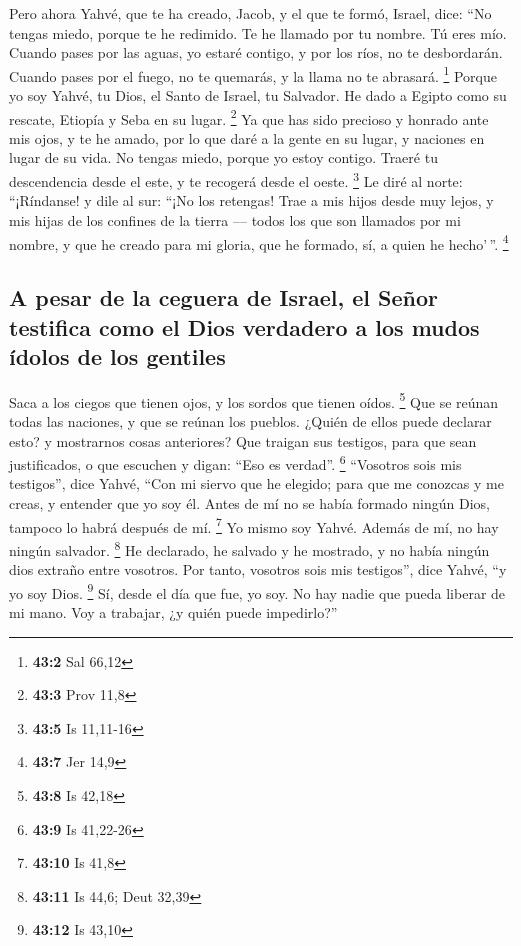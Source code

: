 \begin{paracol}{2}
 Pero ahora Yahvé, que te ha creado, Jacob, y el que te
formó, Israel, dice: ``No tengas miedo, porque te he redimido. Te he
llamado por tu nombre. Tú eres mío.  Cuando pases por las
aguas, yo estaré contigo, y por los ríos, no te desbordarán. Cuando
pases por el fuego, no te quemarás, y la llama no te abrasará.
\footnote{\textbf{43:2} Sal 66,12}  Porque yo soy Yahvé,
tu Dios, el Santo de Israel, tu Salvador. He dado a Egipto como su
rescate, Etiopía y Seba en su lugar. \footnote{\textbf{43:3} Prov 11,8}
 Ya que has sido precioso y honrado ante mis ojos, y te he
amado, por lo que daré a la gente en su lugar, y naciones en lugar de su
vida.  No tengas miedo, porque yo estoy contigo. Traeré tu
descendencia desde el este, y te recogerá desde el oeste. \footnote{\textbf{43:5}
  Is 11,11-16}  Le diré al norte: ``¡Ríndanse! y dile al
sur: ``¡No los retengas! Trae a mis hijos desde muy lejos, y mis hijas
de los confines de la tierra ---  todos los que son
llamados por mi nombre, y que he creado para mi gloria, que he formado,
sí, a quien he hecho'\,''. \footnote{\textbf{43:7} Jer 14,9}

\hypertarget{a-pesar-de-la-ceguera-de-israel-el-seuxf1or-testifica-como-el-dios-verdadero-a-los-mudos-uxeddolos-de-los-gentiles}{%
\subsection{A pesar de la ceguera de Israel, el Señor testifica como el
Dios verdadero a los mudos ídolos de los
gentiles}\label{a-pesar-de-la-ceguera-de-israel-el-seuxf1or-testifica-como-el-dios-verdadero-a-los-mudos-uxeddolos-de-los-gentiles}}

 Saca a los ciegos que tienen ojos, y los sordos que
tienen oídos. \footnote{\textbf{43:8} Is 42,18}  Que se
reúnan todas las naciones, y que se reúnan los pueblos. ¿Quién de ellos
puede declarar esto? y mostrarnos cosas anteriores? Que traigan sus
testigos, para que sean justificados, o que escuchen y digan: ``Eso es
verdad''. \footnote{\textbf{43:9} Is 41,22-26} 
``Vosotros sois mis testigos'', dice Yahvé, ``Con mi siervo que he
elegido; para que me conozcas y me creas, y entender que yo soy él.
Antes de mí no se había formado ningún Dios, tampoco lo habrá después de
mí. \footnote{\textbf{43:10} Is 41,8}  Yo mismo soy
Yahvé. Además de mí, no hay ningún salvador. \footnote{\textbf{43:11} Is
  44,6; Deut 32,39}  He declarado, he salvado y he
mostrado, y no había ningún dios extraño entre vosotros. Por tanto,
vosotros sois mis testigos'', dice Yahvé, ``y yo soy Dios. \footnote{\textbf{43:12}
  Is 43,10}  Sí, desde el día que fue, yo soy. No hay
nadie que pueda liberar de mi mano. Voy a trabajar, ¿y quién puede
impedirlo?''


\end{paracol}

